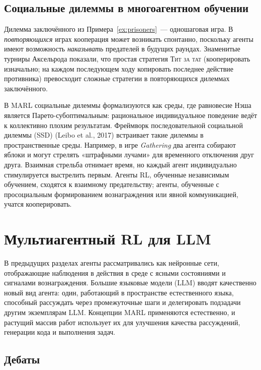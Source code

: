 \subsection{Социальные дилеммы в многоагентном обучении}

Дилемма заключённого из Примера~\ref{ex:prisoners}~--- одношаговая
игра. В \emph{повторяющихся} играх кооперация может возникать спонтанно,
поскольку агенты имеют возможность \emph{наказывать} предателей в будущих
раундах. Знаменитые турниры Аксельрода показали, что простая
стратегия \textsc{Тит за тат} (кооперировать
изначально; на каждом последующем ходу копировать последнее действие противника)
превосходит сложные стратегии в повторяющихся дилеммах заключённого.

В MARL социальные дилеммы формализуются как
среды, где равновесие Нэша является Парето-субоптимальным: рациональное
индивидуальное поведение ведёт к коллективно плохим результатам.
Фреймворк последовательной социальной дилеммы (SSD)
(Leibo et al., 2017) встраивает такие дилеммы в пространственные
среды. Например, в игре \emph{Gathering} два агента
собирают яблоки и могут стрелять «штрафными лучами» для временного отключения
друг друга. Взаимная стрельба отнимает время, но каждый агент индивидуально
стимулируется выстрелить первым. Агенты RL, обученные независимым
обучением, сходятся к взаимному предательству; агенты, обученные с просоциальным
формированием вознаграждения или явной коммуникацией, учатся кооперировать.

\section{Мультиагентный RL для LLM}
\label{sec:marl-llms}

В предыдущих разделах агенты рассматривались как нейронные сети, отображающие
наблюдения в действия в среде с ясными состояниями и сигналами вознаграждения.
Большие языковые модели (LLM)
вводят качественно новый вид агента: один, работающий в
пространстве естественного языка, способный рассуждать через промежуточные шаги и
делегировать подзадачи другим экземплярам LLM. Концепции MARL применяются
естественно, и растущий массив работ использует их для улучшения
качества рассуждений, генерации кода и выполнения задач.

\subsection{Дебаты}

